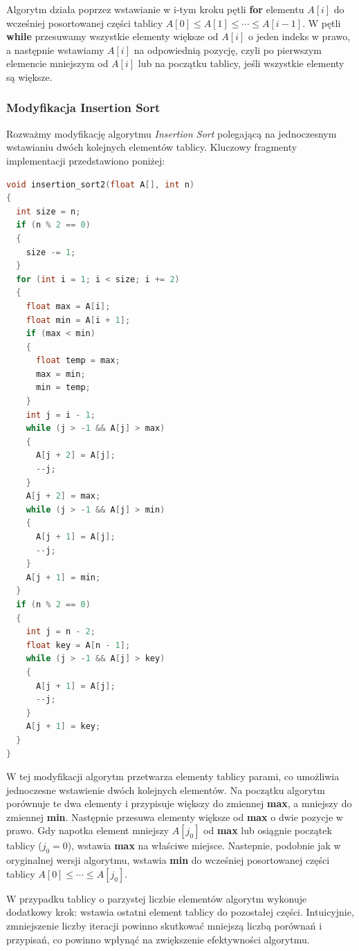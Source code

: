 \documentclass{article}
\begin{document}
Algorytm działa poprzez wstawianie w i-tym kroku pętli \textbf{for} elementu $A[i]$ do wcześniej posortowanej części tablicy $A[0] \leq A[1] \leq \cdots \leq A[i-1]$. W pętli \textbf{while} przesuwamy wszystkie elementy większe od $A[i]$ o jeden indeks w prawo, a następnie wstawiamy $A[i]$ na odpowiednią pozycję, czyli po pierwszym elemencie mniejszym od $A[i]$ lub na początku tablicy, jeśli wszystkie elementy są większe.
\subsubsection{Modyfikacja Insertion Sort}
Rozważmy modyfikację algorytmu \textit{Insertion Sort} polegającą na jednoczesnym wstawianiu dwóch kolejnych elementów tablicy. Kluczowy fragmenty implementacji przedstawiono poniżej:

\newpage

\begin{lstlisting}[style=mystyle, language=C++, caption={Implementacja Modyfikacji Insertion Sort}, label={lst:insertion2}]
void insertion_sort2(float A[], int n)
{
  int size = n;
  if (n % 2 == 0)
  {
    size -= 1;
  }
  for (int i = 1; i < size; i += 2)
  {
    float max = A[i];
    float min = A[i + 1];
    if (max < min)
    {
      float temp = max;
      max = min;
      min = temp;
    }
    int j = i - 1;
    while (j > -1 && A[j] > max)
    {
      A[j + 2] = A[j];
      --j;
    }
    A[j + 2] = max;
    while (j > -1 && A[j] > min)
    {
      A[j + 1] = A[j];
      --j;
    }
    A[j + 1] = min;
  }
  if (n % 2 == 0)
  {
    int j = n - 2;
    float key = A[n - 1];
    while (j > -1 && A[j] > key)
    {
      A[j + 1] = A[j];
      --j;
    }
    A[j + 1] = key;
  }
}
\end{lstlisting}
W tej modyfikacji algorytm przetwarza elementy tablicy parami, co umożliwia jednoczesne wstawienie dwóch kolejnych elementów. Na początku algorytm porównuje te dwa elementy i przypisuje większy do zmiennej \textbf{max}, a mniejszy do zmiennej \textbf{min}. Następnie przesuwa elementy większe od \textbf{max} o dwie pozycje w prawo. Gdy napotka element mniejszy $A[j_0]$ od \textbf{max} lub osiągnie początek tablicy ($j_0 = 0$), wstawia \textbf{max} na właściwe miejsce. Nastepnie, podobnie jak w oryginalnej wersji algorytmu, wstawia \textbf{min} do wcześniej posortowanej części tablicy $A[0] \leq \cdots \leq A[j_0]$.

W przypadku tablicy o parzystej liczbie elementów algorytm wykonuje dodatkowy krok: wstawia ostatni element tablicy do pozostałej części. Intuicyjnie, zmniejszenie liczby iteracji powinno skutkować mniejszą liczbą porównań i przypisań, co powinno wpłynąć na zwiększenie efektywności algorytmu.
\end{document}
